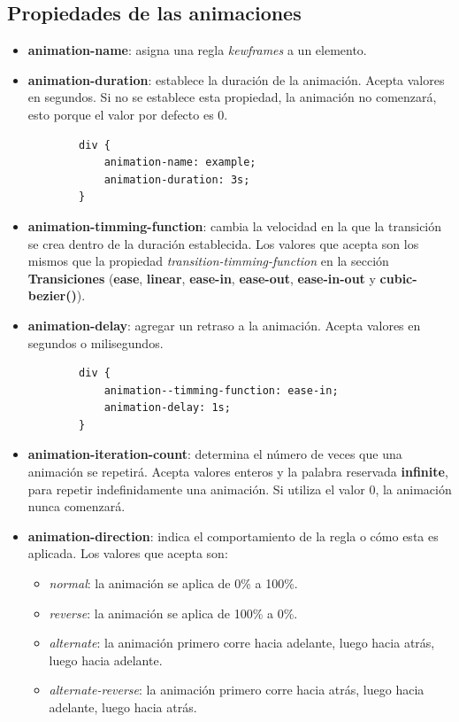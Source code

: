 \subsection{Propiedades de las animaciones}
\begin{itemize}
    \item \textbf{animation-name}: asigna una regla \textit{kewframes} a un elemento.
    \item \textbf{animation-duration}: establece la duración de la animación. Acepta valores en segundos. Si no se establece esta propiedad, la animación no comenzará, esto porque el valor por defecto es 0.
    \begin{lstlisting}
        div {
            animation-name: example;
            animation-duration: 3s;
        }
    \end{lstlisting}
    \item \textbf{animation-timming-function}: cambia la velocidad en la que la transición se crea dentro de la duración establecida. Los valores que acepta son los mismos que la propiedad \textit{transition-timming-function} en la sección \textbf{Transiciones} (\textbf{ease}, \textbf{linear}, \textbf{ease-in}, \textbf{ease-out}, \textbf{ease-in-out} y \textbf{cubic-bezier()}).
    \item \textbf{animation-delay}: agregar un retraso a la animación. Acepta valores en segundos o milisegundos.
    \begin{lstlisting}
        div {
            animation--timming-function: ease-in;
            animation-delay: 1s;
        }
    \end{lstlisting}
    \item \textbf{animation-iteration-count}: determina el número de veces que una animación se repetirá. Acepta valores enteros y la palabra reservada \textbf{infinite}, para repetir indefinidamente una animación. Si utiliza el valor 0, la animación nunca comenzará.
    \item \textbf{animation-direction}: indica el comportamiento de la regla o cómo esta es aplicada. Los valores que acepta son:
    \begin{itemize}
        \item \textit{normal}: la animación se aplica de 0\% a 100\%.
        \item \textit{reverse}: la animación se aplica de 100\% a 0\%.
        \item \textit{alternate}: la animación primero corre hacia adelante, luego hacia atrás, luego hacia adelante.
        \item \textit{alternate-reverse}: la animación primero corre hacia atrás, luego hacia adelante, luego hacia atrás.
    \end{itemize}
\end{itemize}

